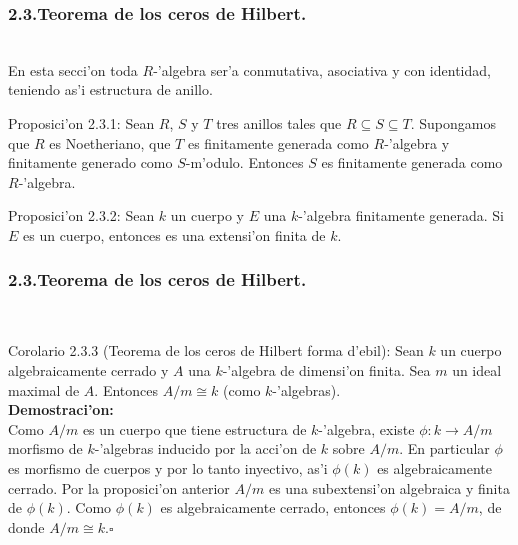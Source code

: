\documentclass[10pt]{beamer}
\begin{document}
\begin{frame}
\frametitle{2.3.Teorema de los ceros de Hilbert.}\\

En esta secci'on toda $R$-'algebra ser'a conmutativa, asociativa y con identidad, teniendo as'i estructura de anillo.\\
\begin{block}{Proposici'on 2.3.1:}
Sean $R$, $S$ y $T$ tres anillos tales que $R \subseteq S \subseteq T$. Supongamos que $R$ es Noetheriano, que $T$ es finitamente generada como $R$-'algebra y finitamente generado como $S$-m'odulo. Entonces $S$ es finitamente generada como $R$-'algebra.\\
\end{block}
\begin{block}{Proposici'on 2.3.2:}
Sean $k$ un cuerpo y $E$ una $k$-'algebra finitamente generada. Si $E$ es un cuerpo, entonces es una extensi'on finita de $k$.\\
\end{block}
\vspace{6cm}
\end{frame}





\begin{frame}
\frametitle{2.3.Teorema de los ceros de Hilbert.}\\
\begin{block}{Corolario 2.3.3 (Teorema de los ceros de Hilbert forma d'ebil):}
Sean $k$ un cuerpo algebraicamente cerrado y $A$ una $k$-'algebra de dimensi'on finita. Sea $m$ un ideal maximal de $A$. Entonces $A/m \cong k$ (como $k$-'algebras).\\
\textbf{Demostraci'on:}\\
Como $A/m$ es un cuerpo que tiene estructura de $k$-'algebra, existe $\phi : k \to A/m$ morfismo de $k$-'algebras inducido por la acci'on de $k$ sobre $A/m$. En particular $\phi$ es morfismo de cuerpos y por lo tanto inyectivo, as'i $\phi (k)$ es algebraicamente cerrado. Por la proposici'on anterior $A/m$ es una subextensi'on algebraica y finita de $\phi (k)$. Como $\phi (k)$ es algebraicamente cerrado, entonces $\phi(k) = A/m $, de donde $A/m \cong k$.\hfill $\square$\\
\end{block}
\vspace{6cm}
\end{frame}
\end{document}
